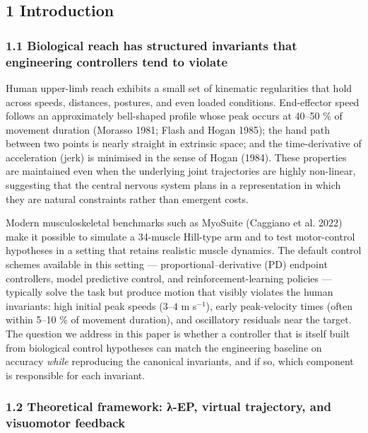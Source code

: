 \documentclass[
  11pt,
]{article}
\begin{document}
\hypertarget{introduction}{%
\subsection{1 Introduction}\label{introduction}}

\hypertarget{biological-reach-has-structured-invariants-that-engineering-controllers-tend-to-violate}{%
\subsubsection{1.1 Biological reach has structured invariants that
engineering controllers tend to
violate}\label{biological-reach-has-structured-invariants-that-engineering-controllers-tend-to-violate}}

Human upper-limb reach exhibits a small set of kinematic regularities
that hold across speeds, distances, postures, and even loaded
conditions. End-effector speed follows an approximately bell-shaped
profile whose peak occurs at 40--50 \% of movement duration (Morasso
1981; Flash and Hogan 1985); the hand path between two points is nearly
straight in extrinsic space; and the time-derivative of acceleration
(jerk) is minimised in the sense of Hogan (1984). These properties are
maintained even when the underlying joint trajectories are highly
non-linear, suggesting that the central nervous system plans in a
representation in which they are natural constraints rather than
emergent costs.

Modern musculoskeletal benchmarks such as MyoSuite (Caggiano et al.
2022) make it possible to simulate a 34-muscle Hill-type arm and to test
motor-control hypotheses in a setting that retains realistic muscle
dynamics. The default control schemes available in this setting ---
proportional--derivative (PD) endpoint controllers, model predictive
control, and reinforcement-learning policies --- typically solve the
task but produce motion that visibly violates the human invariants: high
initial peak speeds (\(3\)--\(4\) m s\(^{-1}\)), early peak-velocity
times (often within 5--10 \% of movement duration), and oscillatory
residuals near the target. The question we address in this paper is
whether a controller that is itself built from biological control
hypotheses can match the engineering baseline on accuracy \emph{while}
reproducing the canonical invariants, and if so, which component is
responsible for each invariant.

\hypertarget{theoretical-framework-ux3bb-ep-virtual-trajectory-and-visuomotor-feedback}{%
\subsubsection{1.2 Theoretical framework: λ-EP, virtual trajectory, and
visuomotor
feedback}\label{theoretical-framework-ux3bb-ep-virtual-trajectory-and-visuomotor-feedback}}
\end{document}
